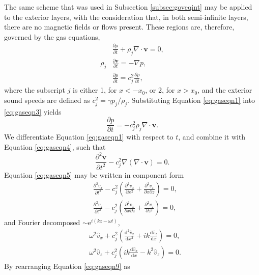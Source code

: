 \documentclass[12pt]{ociamthesis}
\begin{document}
The same scheme that was used in Subsection \ref{subsec:goveqint} may be applied to the exterior layers, with the consideration that, in both semi-infinite layers, there are no magnetic fields or flows present.
These regions are, therefore, governed by the gas equations,
%
\begin{align}
\label{eq:gaseqn1}
& \frac{\partial \rho}{\partial t}
+ \rho_j \nabla \cdot \mathbf{v}
= 0,
\\[0.3cm]
\label{eq:gaseqn2}
\rho_j & \frac{\partial \mathbf{v}}{\partial t}
= - \nabla p,
\\[0.3cm]
\label{eq:gaseqn3}
& \frac{\partial p}{\partial t}
= c_j^2 \frac{\partial \rho}{\partial t},
\end{align}
%
where the subscript $j$ is either 1, for $x < - x_0$, or 2, for $x > x_0$, and the exterior sound speeds are defined as $c_j^2 = \gamma p_j/\rho_j$.
Substituting Equation \eqref{eq:gaseqn1} into \eqref{eq:gaseqn3} yields
%
\begin{equation}
\label{eq:gaseqn4}
\frac{\partial p}{\partial t} = - c_j^2 \rho_j \nabla \cdot \mathbf{v}.
\end{equation}
%
We differentiate Equation \eqref{eq:gaseqn1} with respect to $t$, and combine it with Equation \eqref{eq:gaseqn4}, such that
%
\begin{equation}
\label{eq:gaseqn5}
\frac{\partial^2 \mathbf{v}}{\partial t^2} - c_j^2 \nabla ( \nabla \cdot \mathbf{v} ) = 0.
\end{equation}
%
Equation \eqref{eq:gaseqn5} may be written in component form
%
\begin{align}
\label{eq:gaseqn6}
& \frac{\partial^2 v_x}{\partial t^2}
- c_j^2 \left( \frac{\partial^2 v_x}{\partial x^2}
+ \frac{\partial^2 v_z}{\partial x \partial z} \right)
= 0,
\\[0.3cm]
\label{eq:gaseqn7}
& \frac{\partial^2 v_z}{\partial t^2}
- c_j^2 \left( \frac{\partial^2 v_x}{\partial x \partial z}
+ \frac{\partial^2 v_z}{\partial z^2} \right)
= 0,
\end{align}
%
and Fourier decomposed $\sim \mathrm{e}^{i(k z - \omega t)}$,
%
\begin{align}
\label{eq:gaseqn8}
& \omega^2 \hat v_x
+ c_j^2 \left( \frac{\mathrm{d}^2 \hat v_x}{\mathrm{d} x^2}
+ i k \frac{\mathrm{d} \hat v_z}{\mathrm{d} x} \right)
= 0,
\\[0.3cm]
\label{eq:gaseqn9}
& \omega^2 \hat v_z
+ c_j^2 \left( i k \frac{\mathrm{d} \hat v_x}{\mathrm{d} x}
- k^2 \hat v_z \right)
= 0.
\end{align}
%
By rearranging Equation \eqref{eq:gaseqn9} as
\end{document}

